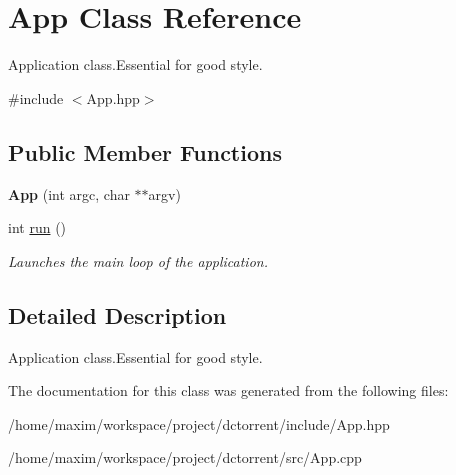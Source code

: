 \hypertarget{class_app}{}\section{App Class Reference}
\label{class_app}


Application class.\+Essential for good style.  




{\ttfamily \#include $<$App.\+hpp$>$}

\subsection*{Public Member Functions}
\begin{DoxyCompactItemize}
\item 
\mbox{\label{class_app_ac94bd74b1c19faaf5c62e3b14e6b10c5}} 
{\bfseries App} (int argc, char $\ast$$\ast$argv)
\item 
\mbox{\label{class_app_a8d27eeb51b813760dc39425d7a9a37e2}} 
int \hyperlink{class_app_a8d27eeb51b813760dc39425d7a9a37e2}{run} ()
\begin{DoxyCompactList}\small\item\em Launches the main loop of the application. \end{DoxyCompactList}\end{DoxyCompactItemize}


\subsection{Detailed Description}
Application class.\+Essential for good style. 

The documentation for this class was generated from the following files\+:\begin{DoxyCompactItemize}
\item 
/home/maxim/workspace/project/dctorrent/include/App.\+hpp\item 
/home/maxim/workspace/project/dctorrent/src/App.\+cpp\end{DoxyCompactItemize}
